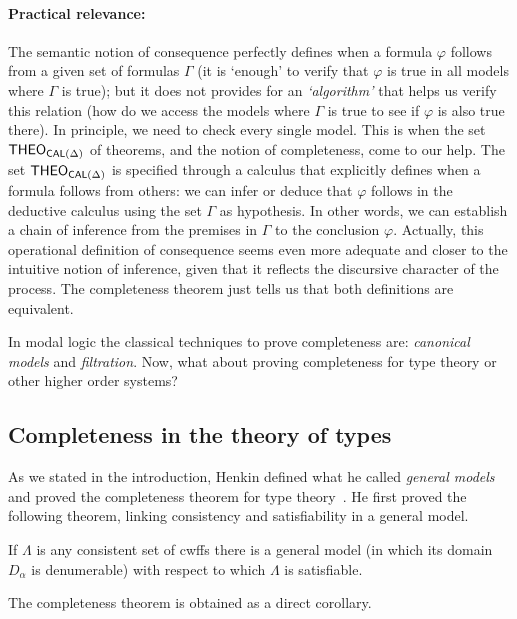\paragraph{Practical relevance:}

The semantic notion of consequence perfectly defines when a formula $\varphi 
$ follows from a given set of formulas $\Gamma $ (it is `enough' to verify
that $\varphi $ is true in all models where $\Gamma $ is true); but it does
not provides for an \emph{`algorithm'} that helps us verify this relation
(how do we access the models where $\Gamma $ is true to see if $\varphi$ is
also true there). In principle, we need to check every single model. This is
when the set $\textsf{THEO}_{\textsf{CAL}(\Delta)}$ of theorems, and the notion of
completeness, come to our help. The set $\textsf{THEO}_{\textsf{CAL}(\Delta)}$ is specified
through a calculus that explicitly defines when a formula follows from
others: we can infer or deduce that $\varphi $ follows in the deductive
calculus using the set $\Gamma$ as hypothesis. In other words, we can
establish a chain of inference from the premises in $\Gamma$ to the
conclusion $\varphi$. Actually, this operational definition of consequence
seems even more adequate and closer to the intuitive notion of inference,
given that it reflects the discursive character of the process. The
completeness theorem just tells us that both definitions are equivalent.

In modal logic the classical techniques to prove completeness are: 
\emph{canonical models} and \emph{filtration}. Now, what about proving
completeness for type theory or other higher order systems?

\subsection{Completeness in the theory of types}

As we stated in the introduction, Henkin defined what he called 
\emph{general models} and proved the completeness theorem for type 
theory~\cite{Henkin1950}. He first proved the following theorem, linking
consistency and satisfiability in a general model.

\begin{theorem}
If $\Lambda$ is any consistent set
of cwffs there is a general model (in which its domain  $D_{\alpha}$
is denumerable) with respect to which $\Lambda$ is satisfiable.
\end{theorem}

The completeness theorem is obtained as a direct corollary.

